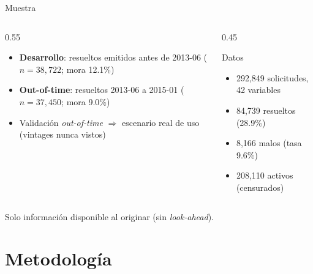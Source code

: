 \documentclass[aspectratio=169, 11pt]{beamer}
\newcommand{\bt}[1]{\textbf{#1}}
\begin{document}
\begin{frame}{Muestra}
  \begin{columns}
    \begin{column}{0.55\textwidth}
      \begin{itemize}
        \item \bt{Desarrollo}: resueltos emitidos antes de 2013-06
              ($n = 38{,}722$; mora 12.1\%)
        \item \bt{Out-of-time}: resueltos 2013-06 a 2015-01
              ($n = 37{,}450$; mora 9.0\%)
        \item Validación \emph{out-of-time} $\Rightarrow$ escenario real de
              uso (vintages nunca vistos)
      \end{itemize}
    \end{column}
    \begin{column}{0.45\textwidth}
      \begin{exampleblock}{Datos}
        \begin{itemize}
          \item 292,849 solicitudes, 42 variables
          \item 84,739 resueltos (28.9\%)
          \item 8,166 malos (tasa 9.6\%)
          \item 208,110 activos (censurados)
        \end{itemize}
      \end{exampleblock}
    \end{column}
  \end{columns}
  \vspace{0.5em}
  \tiny Solo información disponible al originar (sin \emph{look-ahead}).
\end{frame}

\section{Metodología}
\end{document}
